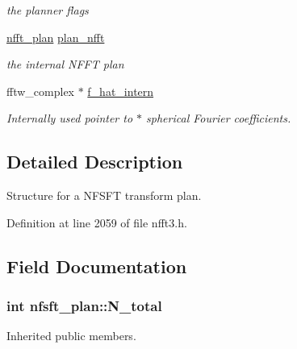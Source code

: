 \begin{CompactItemize}
\begin{CompactList}\small\item\em the planner flags \item\end{CompactList}\item 
\hypertarget{structnfsft__plan_f21a62a31af4918fda1376612398369e}{
\hyperlink{structnfft__plan}{nfft\_\-plan} \hyperlink{structnfsft__plan_f21a62a31af4918fda1376612398369e}{plan\_\-nfft}}
\label{structnfsft__plan_f21a62a31af4918fda1376612398369e}

\begin{CompactList}\small\item\em the internal NFFT plan \item\end{CompactList}\item 
\hypertarget{structnfsft__plan_79156943fb3c87599ee7fa3bc157f548}{
fftw\_\-complex $\ast$ \hyperlink{structnfsft__plan_79156943fb3c87599ee7fa3bc157f548}{f\_\-hat\_\-intern}}
\label{structnfsft__plan_79156943fb3c87599ee7fa3bc157f548}

\begin{CompactList}\small\item\em Internally used pointer to $\ast$ spherical Fourier coefficients. \item\end{CompactList}\end{CompactItemize}


\subsection{Detailed Description}
Structure for a NFSFT transform plan. 

Definition at line 2059 of file nfft3.h.

\subsection{Field Documentation}
\hypertarget{structnfsft__plan_57fe4569f9109b92ed55caeddce686b8}{
\subsubsection{\setlength{\rightskip}{0pt plus 5cm}int {\bf nfsft\_\-plan::N\_\-total}}}
\label{structnfsft__plan_57fe4569f9109b92ed55caeddce686b8}


Inherited public members. 

